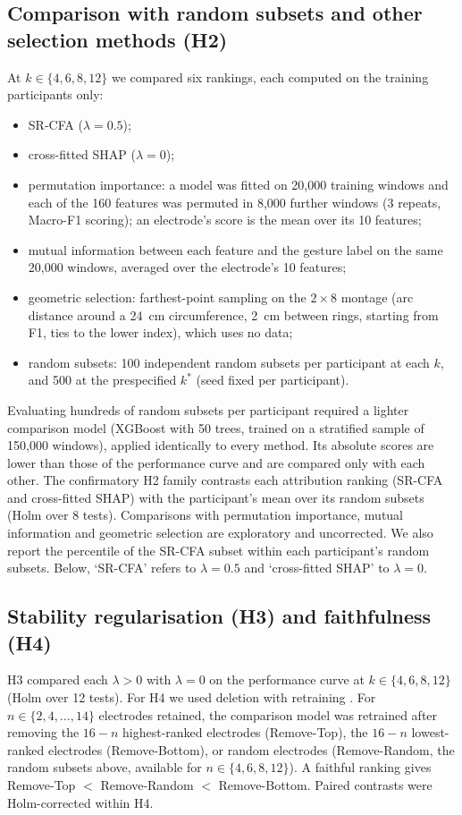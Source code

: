 \subsection{Comparison with random subsets and other selection methods (H2)}
At $k \in \{4, 6, 8, 12\}$ we compared six rankings, each computed on the training participants only:
\begin{itemize}
\item SR-CFA ($\lambda = 0.5$);
\item cross-fitted SHAP ($\lambda = 0$);
\item permutation importance: a model was fitted on 20,000 training windows and each of the 160 features was permuted in 8,000 further windows (3 repeats, Macro-F1 scoring); an electrode's score is the mean over its 10 features;
\item mutual information between each feature and the gesture label on the same 20,000 windows, averaged over the electrode's 10 features;
\item geometric selection: farthest-point sampling on the $2 \times 8$ montage (arc distance around a 24~cm circumference, 2~cm between rings, starting from F1, ties to the lower index), which uses no data;
\item random subsets: 100 independent random subsets per participant at each $k$, and 500 at the prespecified $k^*$ (seed fixed per participant).
\end{itemize}
Evaluating hundreds of random subsets per participant required a lighter comparison model (XGBoost with 50 trees, trained on a stratified sample of 150,000 windows), applied identically to every method. Its absolute scores are lower than those of the performance curve and are compared only with each other. The confirmatory H2 family contrasts each attribution ranking (SR-CFA and cross-fitted SHAP) with the participant's mean over its random subsets (Holm over 8 tests). Comparisons with permutation importance, mutual information and geometric selection are exploratory and uncorrected. We also report the percentile of the SR-CFA subset within each participant's random subsets. Below, `SR-CFA' refers to $\lambda = 0.5$ and `cross-fitted SHAP' to $\lambda = 0$.

\subsection{Stability regularisation (H3) and faithfulness (H4)}
H3 compared each $\lambda > 0$ with $\lambda = 0$ on the performance curve at $k \in \{4, 6, 8, 12\}$ (Holm over 12 tests). For H4 we used deletion with retraining \citep{hooker2019benchmark}. For $n \in \{2, 4, \ldots, 14\}$ electrodes retained, the comparison model was retrained after removing the $16 - n$ highest-ranked electrodes (Remove-Top), the $16 - n$ lowest-ranked electrodes (Remove-Bottom), or random electrodes (Remove-Random, the random subsets above, available for $n \in \{4, 6, 8, 12\}$). A faithful ranking gives Remove-Top $<$ Remove-Random $<$ Remove-Bottom. Paired contrasts were Holm-corrected within H4.

